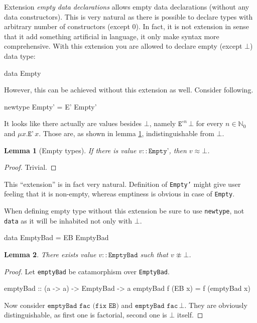 \documentclass[11pt,oneside,draft]{fithesis2}
\newtheorem{lemma}{Lemma}
\begin{document}
Extension \emph{empty data declarations} allows empty data declarations
(without any data constructors). This is very natural as there is possible
to declare types with arbitrary number of constructors (except 0). In
fact, it is not extension in sense that it add something artificial in
language, it only make syntax more comprehensive.
With this extension you are allowed to declare empty (except \(\bot\)) data type:
\begin{code}
data Empty
\end{code}
However, this can be achieved without this extension as well. Consider following.
\begin{code}
newtype Empty' = E' Empty'
\end{code}
It looks like there actually are values besides \(\bot\), namely \(\texttt{E'}^n \, \bot\)
for every \(n \in \mathbb{N}_0\) and \(\mu x . \texttt{E'} \, x\).
Those are, as shown in lemma \ref{emptyTypes}, indistinguishable from \(\bot\).

\begin{lemma}[Empty types]
\label{emptyTypes}
If there is value \(v :: \texttt{Empty'}\), then \(v \approx \bot\).
\end{lemma}

\begin{proof}
Trivial. %
\end{proof}

This ``extension'' is in fact very natural. Definition of \texttt{Empty'}
might give user feeling that it is non-empty, whereas emptiness is
obvious in case of \texttt{Empty}.

When defining empty type without this extension be sure to use
\texttt{newtype}, not \texttt{data} as it will be inhabited not only with \(\bot\).
\begin{code}
data EmptyBad = EB EmptyBad
\end{code}

\begin{lemma}
There exists value \(v :: \texttt{EmptyBad}\) such that \(v \not \approx \bot\).
\end{lemma}

\begin{proof}
Let \texttt{emptyBad} be catamorphism over \texttt{EmptyBad}.
\begin{code}
emptyBad :: (a -> a) -> EmptyBad -> a
emptyBad f (EB x) = f (emptyBad x)
\end{code}
Now consider \(\texttt{emptyBad fac (fix EB)}\) and \(\texttt{emptyBad fac} \, \bot\).
They are obviously distinguishable, as first one is factorial, second one is \(\bot\) itself.
\end{proof}
\end{document}
